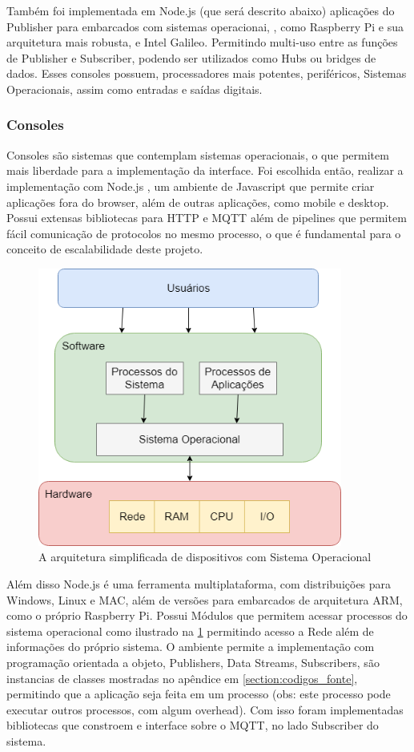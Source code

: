 Também foi implementada em Node.js (que será descrito abaixo) aplicações do Publisher para embarcados com sistemas operacionai, \cite{arm}, como Raspberry Pi \cite{raspberry-pi} e sua arquitetura mais robusta, e Intel Galileo. Permitindo multi-uso entre as funções de Publisher e Subscriber, podendo ser utilizados como Hubs ou bridges de dados. Esses consoles possuem, processadores mais potentes, periféricos, Sistemas Operacionais, assim como entradas e saídas digitais.


\subsubsection{Consoles}
\label{subsubsection:consoles}

Consoles são sistemas que contemplam sistemas operacionais, o que permitem mais liberdade para a implementação da interface. Foi escolhida então, realizar a implementação com Node.js \cite{nodejs}, um ambiente de Javascript que permite criar aplicações fora do browser, além de outras aplicações, como mobile e desktop. Possui extensas bibliotecas para HTTP e MQTT além de pipelines que permitem fácil comunicação de protocolos no mesmo processo, o que é fundamental para o conceito de escalabilidade deste projeto.


\begin{figure}[h!]
\centering
\includegraphics[width=10cm]{./02_Capitulos/02_Cap3/figures/os-diagram}
\caption{A arquitetura simplificada de dispositivos com Sistema Operacional}
\label{fig:3.3.4/os-diagram}
\end{figure}


Além disso Node.js é uma ferramenta multiplataforma, com distribuições para Windows, Linux e MAC, além de versões para embarcados de arquitetura ARM, como o próprio Raspberry Pi. Possui Módulos que permitem acessar processos do sistema operacional como ilustrado na \ref{fig:3.3.4/os-diagram} permitindo acesso a Rede além de informações do próprio sistema. O ambiente permite a implementação com programação orientada a objeto, Publishers, Data Streams, Subscribers, são instancias de classes mostradas no apêndice em \ref{section:codigos_fonte}, permitindo que a aplicação seja feita em um processo (obs: este processo pode executar outros processos, com algum overhead).  Com isso foram implementadas bibliotecas que constroem e interface sobre o MQTT, no lado Subscriber do sistema.


